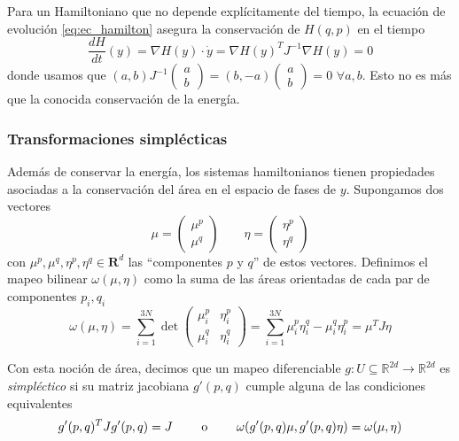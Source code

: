 Para un Hamiltoniano que no depende explícitamente del tiempo, la ecuación de evolución \eqref{eq:ec_hamilton} asegura la conservación de $H(q,p)$ en el tiempo
\[ \frac{dH}{dt}(y) = \nabla H(y)\cdot \dot{y} = \nabla H(y)^T J^{-1}\nabla H(y) = 0\]
donde usamos que $(a,b)J^{-1}\begin{pmatrix}a\\b\end{pmatrix} = (b, -a)\begin{pmatrix}a\\b\end{pmatrix} = 0$ $\forall a,b$.
Esto no es más que la conocida conservación de la energía.

\subsubsection{Transformaciones simplécticas}{\label{sec:trans_simp}}

Además de conservar la energía, los sistemas hamiltonianos tienen propiedades asociadas a la conservación del área en el espacio de fases\cite[pp. 183-185]{BOOK:SPR_INT} de $y$.
Supongamos dos vectores
\[ \mu = \begin{pmatrix} \mu^p\\ \mu^q \end{pmatrix} \qquad \eta = \begin{pmatrix} \eta^p\\ \eta^q \end{pmatrix}  \]
con $\mu^p, \mu^q, \eta^p, \eta^q\in\mathbf{R}^{d}$ las ``componentes $p$ y $q$'' de estos vectores.
Definimos el mapeo bilinear $\omega(\mu,\eta)$ como la suma de las áreas orientadas de cada par de componentes $p_i,q_i$
\begin{equation}
 \omega(\mu, \eta) = \sum_{i=1}^{3N} \det \begin{pmatrix} \mu^p_i & \eta^p_i \\ \mu^q_i & \eta^q_i \end{pmatrix} = \sum_{i=1}^{3N} \mu^p_i\eta^q_i - \mu^q_i\eta^p_i = \mu^T J \eta
\end{equation}

Con esta noción de área, decimos que un mapeo diferenciable $g:U\subseteq\mathbb{R}^{2d}\to\mathbb{R}^{2d}$ es \textit{simpléctico} si su matriz jacobiana $g'(p,q)$ cumple alguna de las condiciones
equivalentes
\begin{equation}{\label{eq:def_trans_simp}}
g'(p,q)^T J g'(p,q) = J \qquad \text{ o } \qquad \omega(g'(p,q)\mu, g'(p,q)\eta) = \omega(\mu, \eta)
\end{equation}

